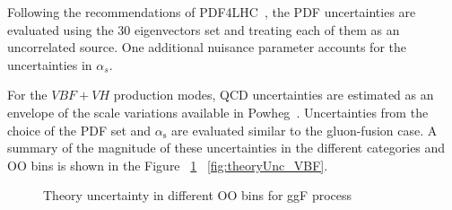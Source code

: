 Following the recommendations of PDF4LHC~\cite{pdf4lhc}, the PDF uncertainties are evaluated using the 30 eigenvectors set and treating each of them as an uncorrelated source. One additional nuisance parameter accounts for the uncertainties in $\alpha_{s}$.

For the $VBF+VH$ production modes, QCD uncertainties are estimated as an envelope of the scale variations available in Powheg~\cite{Nason:2009ai,VBFVH_theoryUnc}. Uncertainties from the choice of the PDF set and $\alpha_\mathrm{s}$ are evaluated similar to the gluon-fusion case.
A summary of the magnitude of these uncertainties in the different categories and OO bins is shown in the Figure ~\ref{fig:theoryUnc_ggF} ~\ref{fig:theoryUnc_VBF}.

\begin{figure}[htbp]
\centering
  \caption{Theory uncertainty in different OO bins for ggF process}
  \label{fig:theoryUnc_ggF}
\end{figure}

